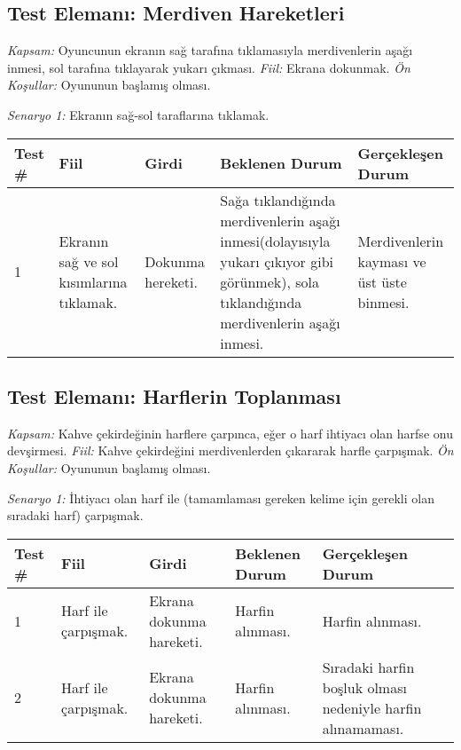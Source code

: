 \documentclass[12pt,a4paper]{article}
\begin{document}
   \subsection{Test Elemanı: Merdiven Hareketleri}
   \textit{Kapsam:} Oyuncunun ekranın sağ tarafına tıklamasıyla merdivenlerin aşağı inmesi, sol tarafına tıklayarak yukarı çıkması. \newline
   \textit{Fiil:} Ekrana dokunmak. \newline
   \textit{Ön Koşullar:} Oyununun başlamış olması. \newline

   \textit{Senaryo 1:} Ekranın sağ-sol taraflarına tıklamak. \newline

   \begin{center}
      \begin{tabular}{ | l | p{3cm} | p{3cm} | p{3cm} | p{5cm} | }
      \hline
      Test \# & Fiil & Girdi & Beklenen Durum & Gerçekleşen Durum \\ \hline
      1 & Ekranın sağ ve sol kısımlarına tıklamak.  & Dokunma hereketi. & Sağa tıklandığında merdivenlerin aşağı inmesi(dolayısıyla yukarı çıkıyor gibi görünmek), sola tıklandığında merdivenlerin aşağı inmesi. & Merdivenlerin kayması ve üst üste binmesi. \\ \hline
      \end{tabular}
   \end{center}

   \subsection{Test Elemanı: Harflerin Toplanması}
   \textit{Kapsam:} Kahve çekirdeğinin harflere çarpınca, eğer o harf ihtiyacı olan harfse onu devşirmesi. \newline
   \textit{Fiil:} Kahve çekirdeğini merdivenlerden çıkararak harfle çarpışmak. \newline
   \textit{Ön Koşullar:} Oyununun başlamış olması. \newline

   \textit{Senaryo 1:} İhtiyacı olan harf ile (tamamlaması gereken kelime için gerekli olan sıradaki harf) çarpışmak. \newline

   \begin{center}
      \begin{tabular}{ | l | p{3cm} | p{3cm} | p{3cm} | p{5cm} | }
      \hline
      Test \# & Fiil & Girdi & Beklenen Durum & Gerçekleşen Durum \\ \hline
      1 & Harf ile çarpışmak. & Ekrana dokunma hareketi. & Harfin alınması. & Harfin alınması. \\ \hline
      2 & Harf ile çarpışmak. & Ekrana dokunma hareketi. & Harfin alınması. & Sıradaki harfin boşluk olması nedeniyle harfin alınamaması. \\ \hline
      \end{tabular}
   \end{center}
\end{document}
